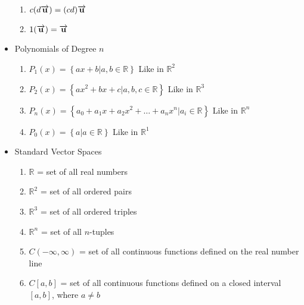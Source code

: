 \documentclass[12pt]{article}
\begin{document}
\begin{itemize}
\begin{enumerate}
      \item $c(d\overrightarrow{\bold{u}})=(cd)\overrightarrow{\bold{u}}$

      \item $1(\overrightarrow{\bold{u}})=\overrightarrow{\bold{u}}$

    \end{enumerate}

  \item Polynomials of Degree $n$

    \begin{enumerate}

      \item $P_1(x)=\left\{ ax+b \big| a,b\in\mathbb{R} \right\}$ Like in $\mathbb{R}^2$

      \item $P_2(x)=\left\{ ax^2+bx+c \big| a,b,c\in\mathbb{R} \right\}$ Like in $\mathbb{R}^3$

      \item $P_n(x)=\left\{ a_0+a_1x+a_2x^2+\dots+a_nx^n \big| a_i\in\mathbb{R} \right\}$ Like in $\mathbb{R}^n$

      \item $P_0(x)=\left\{ a \big| a\in\mathbb{R} \right\}$ Like in $\mathbb{R}^1$

    \end{enumerate}

    \newpage

  \item Standard Vector Spaces

    \begin{enumerate}

      \item $\mathbb{R}$ = set of all real numbers

      \item $\mathbb{R}^2$ = set of all ordered pairs

      \item $\mathbb{R}^3$ = set of all ordered triples

      \item $\mathbb{R}^n$ = set of all $n$-tuples

      \item $C(-\infty,\infty)$ = set of all continuous functions defined on the real number line

      \item $C[a,b]$ = set of all continuous functions defined on a closed interval $[a,b]$, where $a\neq b$


\end{enumerate}
\end{itemize}
\end{document}
